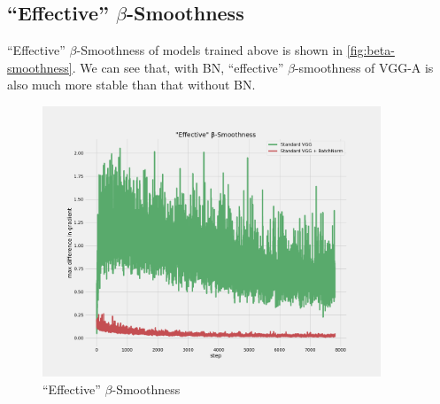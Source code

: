 \documentclass[10pt]{article}
\begin{document}
\subsection{``Effective'' $\beta$-Smoothness}
``Effective'' $\beta$-Smoothness of models trained above is shown in \autoref{fig:beta-smoothness}. We can see that, with BN, ``effective'' $\beta$-smoothness of VGG-A is also much more stable than that without BN.


\begin{figure}[htb]
  \centering
  \includegraphics[width=0.9\textwidth]{figures/beta_smoothness.png}
  \caption{%
    ``Effective'' $\beta$-Smoothness}
  \label{fig:beta-smoothness}
\end{figure}


\newpage


\end{document}
